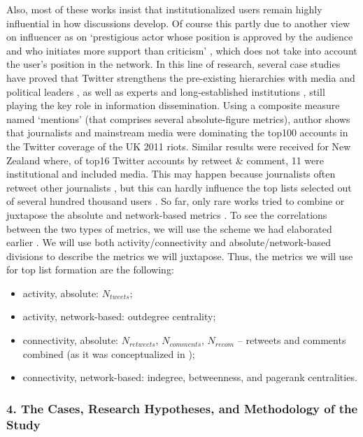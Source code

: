 Also, most of these works insist that institutionalized users remain highly influential in how discussions develop. Of course this partly due to another view on influencer as on ‘prestigious actor whose position is approved by the audience and who initiates more support than criticism’ \cite{Adam}, which does not take into account the user’s position in the network. In this line of research, several case studies have proved that Twitter strengthens the pre-existing hierarchies with media and political leaders \cite{WuHofmanMason,VaccariValerianiBarbera,JungherrJuergens}, as well as experts and long-established institutions \cite{FoxZickuhrSmith,Page}, still playing the key role in information dissemination. Using a composite measure named ‘mentions’ (that comprises several absolute-figure metrics), author \cite{Vis} shows that journalists and mainstream media were dominating the top100 accounts in the Twitter coverage of the UK 2011 riots. Similar results were received for New Zealand \cite{Bruns2014} where, of top16 Twitter accounts by retweet \& comment, 11 were institutional and included media. This may happen because journalists often retweet other journalists \cite{LotanGraeffAnanny}, but this can hardly influence the top lists selected out of several hundred thousand users
.
So far, only rare works tried to combine or juxtapose the absolute and network-based metrics \cite{BodrunovaLitvinenkoBlekanov2016,Adam,GruzdRoy,XuSangBlasiola}. To see the correlations between the two types of metrics, we will use the scheme we had elaborated earlier \cite{BodrunovaLitvinenkoBlekanov2016}. We will use both activity/connectivity and absolute/network-based divisions to describe the metrics we will juxtapose. Thus, the metrics we will use for top list formation are the following:

\begin{itemize}
	\item activity, absolute: \(N_{tweets}\);
	\item activity, network-based: outdegree centrality;
	\item connectivity, absolute: \(N_{retweets}\), \(N_{comments}\), \(N_{recom}\) -- retweets and comments combined (as it was conceptualized in \cite{Bruns2014});
	\item connectivity, network-based: indegree, betweenness, and pagerank centralities.
\end{itemize}

\subsubsection{4. The Cases, Research Hypotheses, and Methodology of the Study}

